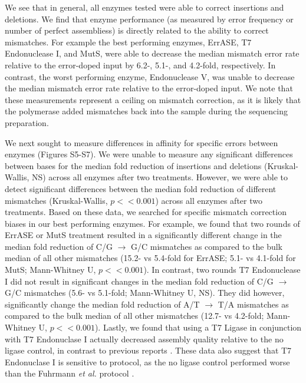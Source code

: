 \documentclass[letterpaper,12pt]{article}
\begin{document}
We see that in general, all enzymes tested were able to correct insertions and deletions. We find that enzyme performance (as measured by error frequency or number of perfect assembliess) is directly related to the ability to correct mismatches. For example the best performing enzymes, ErrASE, T7 Endonuclease I, and MutS, were able to decrease the median mismatch error rate relative to the error-doped input by 6.2-, 5.1-, and 4.2-fold, respectively. In contrast, the worst performing enzyme, Endonuclease V, was unable to decrease the median mismatch error rate relative to the error-doped input. We note that these measurements represent a ceiling on mismatch correction, as it is likely that the polymerase added mismatches back into the sample during the sequencing preparation.

We next sought to measure differences in affinity for specific errors between enzymes (Figures S5-S7). We were unable to measure any significant differences between bases for the median fold reduction of insertions and deletions (Kruskal-Wallis, NS) across all enzymes after two treatments. However, we were able to detect significant differences between the median fold reduction of different mismatches (Kruskal-Wallis, $p << 0.001$) across all enzymes after two treatments. Based on these data, we searched for specific mismatch correction biases in our best performing enzymes. For example, we found that two rounds of ErrASE or MutS treatment resulted in a significantly different change in the median fold reduction of C/G $\to$ G/C mismatches as compared to the bulk median of all other mismatches (15.2- vs 5.4-fold for ErrASE; 5.1- vs 4.1-fold for MutS; Mann-Whitney U, $p << 0.001$). In contrast, two rounds T7 Endonuclease I did not result in significant changes in the median fold reduction of C/G $\to$ G/C mismatches (5.6- vs 5.1-fold; Mann-Whitney U, NS). They did however, significantly change the median fold reduction of A/T $\to$ T/A mismatches as compared to the bulk median of all other mismatches (12.7- vs 4.2-fold; Mann-Whitney U, $p << 0.001$). Lastly, we found that using a T7 Ligase in conjunction with T7 Endonuclase I actually decreased assembly quality relative to the no ligase control, in contrast to previous reports \cite{huang2012}. These data also suggest that T7 Endonuclase I is sensitive to protocol, as the no ligase control performed worse than the Fuhrmann \textit{et al.} protocol \cite{fuhrmann2005}.
\end{document}
